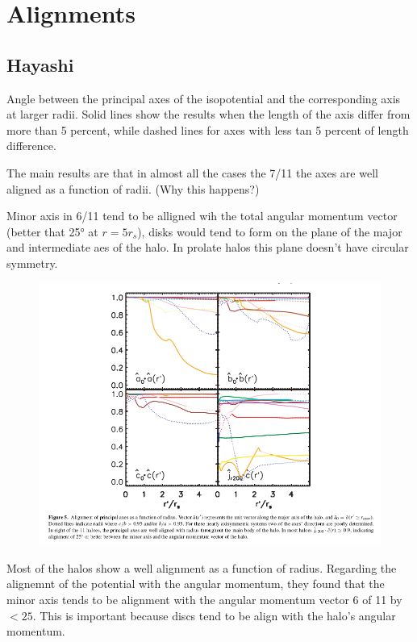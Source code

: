 \documentclass[12pt]{article}
\begin{document}
\section{Alignments}

\subsection{Hayashi}

Angle between the principal axes of the isopotential and the corresponding
axis at larger radii. Solid lines show the results when the length of the 
axis differ from more than 5 percent, while dashed lines for axes with 
less tan 5 percent of length difference.

The main results are that in almost all the cases the 7/11 the axes are 
well aligned as a function of radii. (Why this happens?)

Minor axis in 6/11 tend to be alligned wih the total angular momentum vector 
(better that 25° at $r=5r_s$), disks would tend to form on the plane of 
the major and intermediate aes of the halo. In prolate halos this plane
doesn't have circular symmetry.


\begin{figure}
\includegraphics[scale=0.5]{alignmentH.png}
\end{figure}		

Most of the halos show a well alignment as a function of radius. 
Regarding the alignemnt of the potential with the angular momentum, they 
found that the minor axis tends to be alignment with the angular 
momentum vector 6 of 11 by $<25$. This is important because discs tend 
to be align with the halo's angular momentum. 
\end{document}
